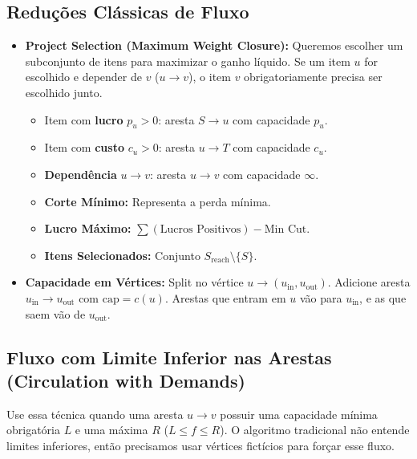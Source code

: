 \subsection{Reduções Clássicas de Fluxo}

\begin{itemize}
    \item \textbf{Project Selection (Maximum Weight Closure):}
    Queremos escolher um subconjunto de itens para maximizar o ganho líquido. Se um item $u$ for escolhido e depender de $v$ ($u \to v$), o item $v$ obrigatoriamente precisa ser escolhido junto.
    \begin{itemize}
        \item Item com \textbf{lucro} $p_u > 0$: aresta $S \to u$ com capacidade $p_u$.
        \item Item com \textbf{custo} $c_u > 0$: aresta $u \to T$ com capacidade $c_u$.
        \item \textbf{Dependência} $u \to v$: aresta $u \to v$ com capacidade $\infty$.
        \item \textbf{Corte Mínimo:} Representa a perda mínima.
        \item \textbf{Lucro Máximo:} $\sum (\text{Lucros Positivos}) - \text{Min Cut}$.
        \item \textbf{Itens Selecionados:} Conjunto $S_{\text{reach}} \setminus \{S\}$.
    \end{itemize}

    \item \textbf{Capacidade em Vértices:}
    Split no vértice $u \to (u_{\text{in}}, u_{\text{out}})$. Adicione aresta $u_{\text{in}} \to u_{\text{out}}$ com $\text{cap} = c(u)$. Arestas que entram em $u$ vão para $u_{\text{in}}$, e as que saem vão de $u_{\text{out}}$.
\end{itemize}

\subsection{Fluxo com Limite Inferior nas Arestas (Circulation with Demands)}
Use essa técnica quando uma aresta $u \to v$ possuir uma capacidade mínima obrigatória $L$ e uma máxima $R$ ($L \le f \le R$). O algoritmo tradicional não entende limites inferiores, então precisamos usar vértices fictícios para forçar esse fluxo.

